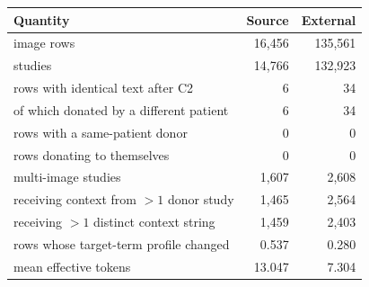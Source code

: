 \begin{tabular}{lrr}
\toprule
Quantity & Source & External\\
\midrule
image rows & 16,456 & 135,561\\
studies & 14,766 & 132,923\\
rows with identical text after C2 & 6 & 34\\
\quad of which donated by a different patient & 6 & 34\\
rows with a same-patient donor & 0 & 0\\
rows donating to themselves & 0 & 0\\
multi-image studies & 1,607 & 2,608\\
\quad receiving context from $>1$ donor study & 1,465 & 2,564\\
\quad receiving $>1$ distinct context string & 1,459 & 2,403\\
rows whose target-term profile changed & 0.537 & 0.280\\
mean effective tokens & 13.047 & 7.304\\
\bottomrule
\end{tabular}
